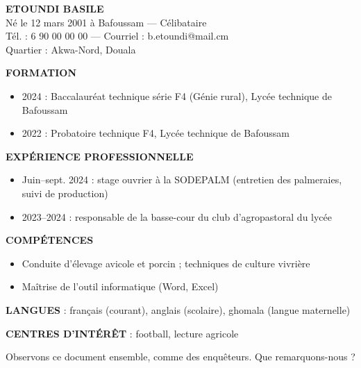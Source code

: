 \documentclass[11pt]{article}
\begin{document}
\begin{exemplebox}
\textbf{ETOUNDI BASILE}\\
Né le 12 mars 2001 à Bafoussam — Célibataire\\
Tél. : 6 90 00 00 00 — Courriel : b.etoundi@mail.cm\\
Quartier : Akwa-Nord, Douala

\textbf{FORMATION}
\begin{itemize}
\item 2024 : Baccalauréat technique série F4 (Génie rural), Lycée technique de Bafoussam
\item 2022 : Probatoire technique F4, Lycée technique de Bafoussam
\end{itemize}

\textbf{EXPÉRIENCE PROFESSIONNELLE}
\begin{itemize}
\item Juin--sept. 2024 : stage ouvrier à la SODEPALM (entretien des palmeraies, suivi de production)
\item 2023--2024 : responsable de la basse-cour du club d'agropastoral du lycée
\end{itemize}

\textbf{COMPÉTENCES}
\begin{itemize}
\item Conduite d'élevage avicole et porcin ; techniques de culture vivrière
\item Maîtrise de l'outil informatique (Word, Excel)
\end{itemize}

\textbf{LANGUES} : français (courant), anglais (scolaire), ghomala (langue maternelle)

\textbf{CENTRES D'INTÉRÊT} : football, lecture agricole
\end{exemplebox}

Observons ce document ensemble, comme des enquêteurs. Que remarquons-nous ?
\end{document}
